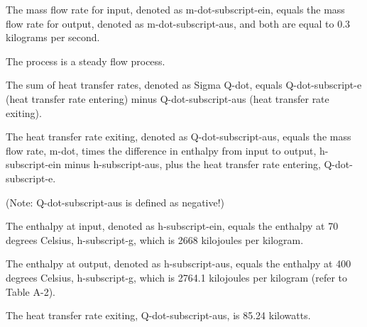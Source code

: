 The mass flow rate for input, denoted as m-dot-subscript-ein, equals the mass flow rate for output, denoted as m-dot-subscript-aus, and both are equal to 0.3 kilograms per second.

The process is a steady flow process.

The sum of heat transfer rates, denoted as Sigma Q-dot, equals Q-dot-subscript-e (heat transfer rate entering) minus Q-dot-subscript-aus (heat transfer rate exiting).

The heat transfer rate exiting, denoted as Q-dot-subscript-aus, equals the mass flow rate, m-dot, times the difference in enthalpy from input to output, h-subscript-ein minus h-subscript-aus, plus the heat transfer rate entering, Q-dot-subscript-e.

(Note: Q-dot-subscript-aus is defined as negative!)

The enthalpy at input, denoted as h-subscript-ein, equals the enthalpy at 70 degrees Celsius, h-subscript-g, which is 2668 kilojoules per kilogram.

The enthalpy at output, denoted as h-subscript-aus, equals the enthalpy at 400 degrees Celsius, h-subscript-g, which is 2764.1 kilojoules per kilogram (refer to Table A-2).

The heat transfer rate exiting, Q-dot-subscript-aus, is 85.24 kilowatts.